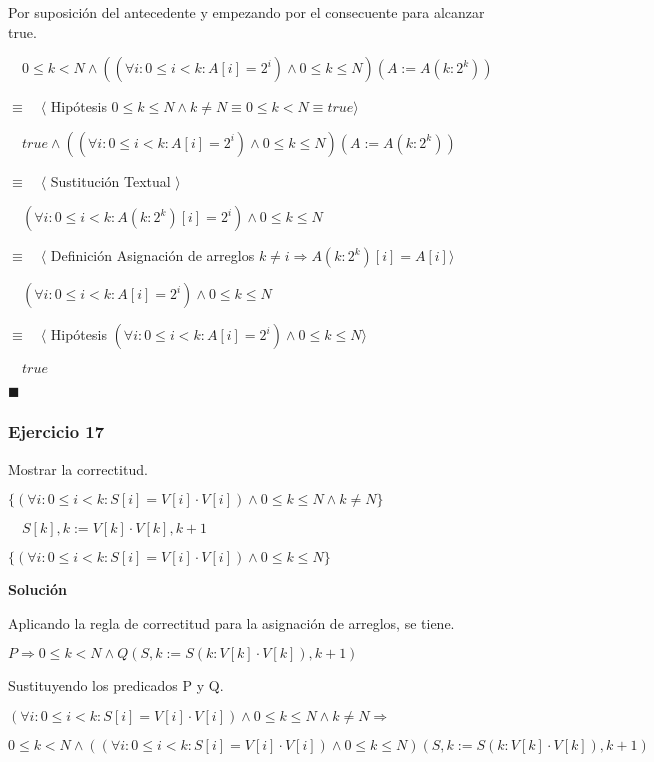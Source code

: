 \documentclass[hidelinks]{article}
\begin{document}
Por suposición del antecedente y empezando por el consecuente para alcanzar
true.\par
$\quad 0 \leq k < N \land ((\forall i : 0 \leq i < k : A[i] = 2^i) \land 0 \leq k \leq N)(A := A(k : 2^k))$\par
$\equiv \quad \langle$ Hipótesis $ 0 \leq k \leq N \land k \neq N \equiv 0 \leq k < N \equiv true \rangle$\par
$\quad true \land ((\forall i : 0 \leq i < k : A[i] = 2^i) \land 0 \leq k \leq N)(A := A(k : 2^k))$\par
$\equiv \quad \langle$ Sustitución Textual $ \rangle$\par
$\quad (\forall i : 0 \leq i < k : A(k : 2^k)[i] = 2^i) \land 0 \leq k \leq N$\par
$\equiv \quad \langle$ Definición Asignación de arreglos $ k \neq i \Rightarrow A(k : 2^k)[i] = A[i] \rangle$\par
$\quad (\forall i : 0 \leq i < k : A[i] = 2^i) \land 0 \leq k \leq N$\par
$\equiv \quad \langle$ Hipótesis $ (\forall i : 0 \leq i < k : A[i] = 2^i) \land 0 \leq k \leq N \rangle$\par
$\quad true $\par
$\blacksquare$\par

\newpage

\subsubsection{Ejercicio 17}


Mostrar la correctitud.\par
$\{ (\forall i : 0 \leq i < k : S[i] = V[i] \cdot V[i]) \land 0 \leq k \leq N \land k \neq N\}$\par
$\quad S[k],k := V[k] \cdot V[k], k+1$\par
$\{ (\forall i : 0 \leq i < k : S[i] = V[i] \cdot V[i]) \land 0 \leq k \leq N\}$\par

\textbf{Solución}\par

Aplicando la regla de correctitud para la asignación de arreglos, se tiene.\par
$P \Rightarrow 0 \leq k < N \land Q(S, k := S(k : V[k] \cdot V[k]), k+1)$\par

Sustituyendo los predicados P y Q.\par
$(\forall i : 0 \leq i < k : S[i] = V[i] \cdot V[i]) \land 0 \leq k \leq N \land k \neq N \Rightarrow$\par
$0 \leq k < N \land ((\forall i : 0 \leq i < k : S[i] = V[i] \cdot V[i]) \land 0 \leq k \leq N)(S, k := S(k : V[k] \cdot V[k]), k+1)$\par
\end{document}
